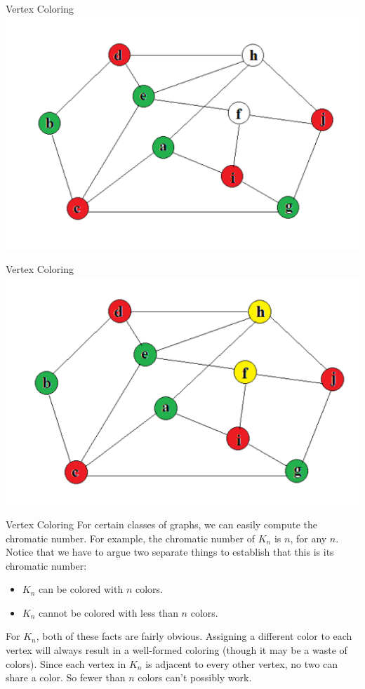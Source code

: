 \documentclass{beamer}
\begin{document}
\begin{frame}{Vertex Coloring}
    \centering \includegraphics[width=.7\linewidth]{p2.PNG}
\end{frame}

\begin{frame}{Vertex Coloring}
    \centering \includegraphics[width=.7\linewidth]{p3.PNG}
\end{frame}

\begin{frame}{Vertex Coloring}
    For certain classes of graphs, we can easily compute the chromatic number. For example, the chromatic number of $K_n$ is $n$, for any $n$. Notice that we have to argue two separate things to establish that this is its chromatic number:
    \begin{itemize}
        \item $K_n$ can be colored with $n$ colors.
        \item $K_n$ cannot be colored with less than $n$ colors.
    \end{itemize}
    For $K_n$, both of these facts are fairly obvious. Assigning a diﬀerent color to each vertex will always result in a well-formed coloring (though it may be a waste of colors). Since each vertex in $K_n$ is adjacent to every other vertex, no two can share a color. So fewer than $n$ colors can’t possibly work.
\end{frame}
\end{document}
